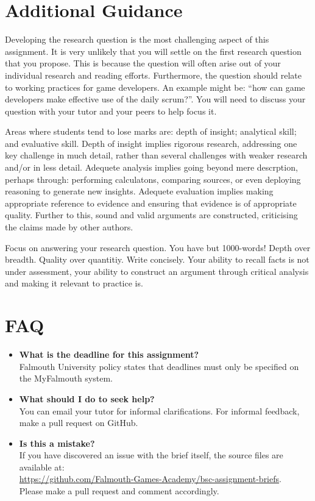 \documentclass{../fal_assignment}
\begin{document}
\section*{Additional Guidance}

Developing the research question is the most challenging aspect of this assignment. It is very unlikely that you will settle on the first research question that you propose. This is because the question will often arise out of your individual research and reading efforts. Furthermore, the question should relate to working practices for game developers. An example might be: ``how can game developers make effective use of the daily scrum?''. You will need to discuss your question with your tutor and your peers to help focus it.

Areas where students tend to lose marks are: depth of insight; analytical skill; and evaluative skill. Depth of insight implies rigorous research, addressing one key challenge in much detail, rather than several challenges with weaker research and/or in less detail. Adequete analysis implies going beyond mere descrption, perhaps through: performing calculatons, comparing sources, or even deploying reasoning to generate new insights. Adequete evaluation implies making appropriate reference to evidence and ensuring that evidence is of appropriate quality. Further to this, sound and valid arguments are constructed, criticising the claims made by other authors.

Focus on answering your research question. You have but 1000-words! Depth over breadth. Quality over quantitiy. Write concisely. Your ability to recall facts is not under assessment, your ability to construct an argument through critical analysis and making it relevant to practice is.

\section*{FAQ}

\begin{itemize}
	\item 	\textbf{What is the deadline for this assignment?} \\ 
    		Falmouth University policy states that deadlines must only be specified on the MyFalmouth system.
    		
	\item 	\textbf{What should I do to seek help?} \\ 
    		You can email your tutor for informal clarifications. For informal feedback, make a pull request on GitHub. 
    		
    	\item 	\textbf{Is this a mistake?} \\ 	
    		If you have discovered an issue with the brief itself, the source files are available at: \\
    		\url{https://github.com/Falmouth-Games-Academy/bsc-assignment-briefs}.\\
    		 Please make a pull request and comment accordingly.
\end{itemize}
\end{document}
